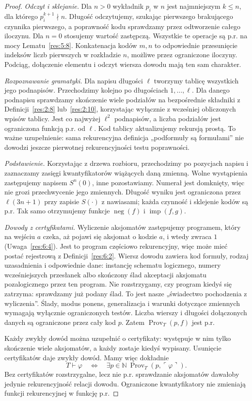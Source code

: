 \begin{proof}
\emph{Odczyt i sklejanie.} Dla $n>0$ wykładnik $p_i$ w $n$ jest najmniejszym $k\le n$, dla którego $p_i^{k+1}\nmid n$. Długość odczytujemy, szukając pierwszego brakującego czynnika pierwszego, a poprawność kodu sprawdzamy przez odtworzenie całego iloczynu. Dla $n=0$ stosujemy wartość zastępczą. Wszystkie te operacje są p.r. na mocy Lematu~\ref{res:5:8}. Konkatenacja kodów $m,n$ to odpowiednie przesunięcie indeksów liczb pierwszych w rozkładzie $n$, możliwe przez ograniczone iloczyny. Podciąg, dołączenie elementu i odczyt wiersza dowodu mają ten sam charakter.

\emph{Rozpoznawanie gramatyki.} Dla napisu długości $\ell$ tworzymy tablicę wszystkich jego podnapisów. Przechodzimy kolejno po długościach $1,\ldots,\ell$. Dla danego podnapisu sprawdzamy skończenie wiele podziałów na bezpośrednie składniki z Definicji~\ref{res:2:8} lub~\ref{res:2:10}, korzystając wyłącznie z wcześniej obliczonych wpisów tablicy. Jest co najwyżej $\ell^2$ podnapisów, a liczba podziałów jest ograniczona funkcją p.r. od $\ell$. Kod tablicy aktualizujemy rekursją prostą. To ważne uzupełnienie: sama rekurencyjna definicja „podformuły są formułami” nie dowodzi jeszcze pierwotnej rekurencyjności testu poprawności.

\emph{Podstawienie.} Korzystając z drzewa rozbioru, przechodzimy po pozycjach napisu i zaznaczamy zasięgi kwantyfikatorów wiążących daną zmienną. Wolne wystąpienia zastępujemy napisem $S^n(0)$, inne pozostawiamy. Numerał jest domknięty, więc nie grozi przechwycenie jego zmiennych. Długość wyniku jest ograniczona przez $\ell(3n+1)$ przy zapisie $S(\cdot)$ z nawiasami; każda czynność i sklejenie kodów są p.r. Tak samo otrzymujemy funkcje $\operatorname{neg}(f)$ i $\operatorname{imp}(f,g)$.

\emph{Dowody z certyfikatami.} Wyliczenie aksjomatów zastępujemy programem, który na wejściu $a$ czeka, aż pojawi się aksjomat o kodzie $a$, i wtedy zwraca $1$ (Uwaga~\ref{res:6:4}). Jest to program częściowo rekurencyjny, więc może mieć postać rejestrową z Definicji~\ref{res:6:2}. Wiersz dowodu zawiera kod formuły, rodzaj uzasadnienia i odpowiednie dane: instancję schematu logicznego, numery wcześniejszych przesłanek albo skończony ślad akceptacji aksjomatu pozalogicznego przez ten program. Nie rozstrzygamy, czy program kiedyś się zatrzyma: sprawdzamy już podany ślad. To jest nasze „świadectwo pochodzenia z wyliczenia”. Ślady, modus ponens, generalizacja i warunki dotyczące zmiennych wymagają wyłącznie ograniczonych testów. Liczba wierszy i długości dołączonych danych są ograniczone przez cały kod $p$. Zatem $\operatorname{Prov}_T(p,f)$ jest p.r.

Każdy zwykły dowód można uzupełnić o certyfikaty: występuje w nim tylko skończenie wiele aksjomatów, a każdy zostaje kiedyś wypisany. Usunięcie certyfikatów daje zwykły dowód. Mamy więc dokładnie
\[
T\vdash\varphi\quad\Longleftrightarrow\quad\exists p\in\mathbb N\ \operatorname{Prov}_T(p,\ulcorner\varphi\urcorner).
\]
Bez certyfikatów rozstrzygalne, lecz nie p.r. sprawdzanie aksjomatów dawałoby jedynie rekurencyjność relacji dowodu. Ograniczone kwantyfikatory nie zmieniają funkcji rekurencyjnej w funkcję p.r.
\end{proof}

